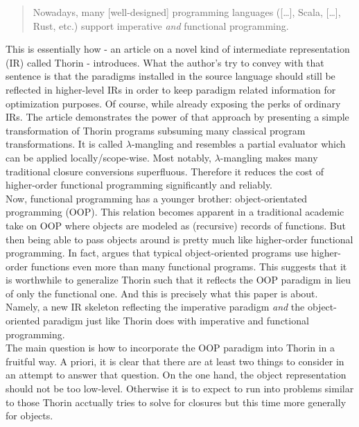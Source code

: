 \begin{quotation}
  Nowadays, many [well-designed] programming languages ([\ldots], Scala, [\ldots], Rust, etc.) support imperative \textit{and} functional programming.
\end{quotation}
This is essentially how \cite{thorin} - an article on a novel kind of intermediate representation (IR) called Thorin - introduces.
What the author's try to convey with that sentence is that the paradigms installed in the source language should still be reflected in higher-level IRs in order to keep paradigm related information for optimization purposes.
Of course, while already exposing the perks of ordinary IRs.
The article demonstrates the power of that approach by presenting a simple transformation of Thorin programs subsuming {\glqq}many classical program transformations{\grqq}.
It is called $\lambda$-mangling and resembles a partial evaluator which can be applied locally/scope-wise.
Most notably, $\lambda$-mangling makes many traditional closure conversions superfluous. Therefore it reduces the cost of higher-order functional programming significantly and reliably.
\\
Now, functional programming has a younger brother: object-orientated programming (OOP).
This relation becomes apparent in a traditional academic take on OOP where objects are modeled as (recursive) records of functions.
But then being able to pass objects around is pretty much like higher-order functional programming.
In fact, \cite{cook} argues that typical object-oriented programs use higher-order functions even more than many functional programs.
This suggests that it is worthwhile to generalize Thorin such that it reflects the OOP paradigm in lieu of only the functional one.
And this is precisely what this paper is about.
Namely, a new IR skeleton reflecting the imperative paradigm \textit{and} the object-oriented paradigm just like Thorin does with imperative and functional programming.
\\
The main question is how to incorporate the OOP paradigm into Thorin in a fruitful way.
A priori, it is clear that there are at least two things to consider in an attempt to answer that question.
On the one hand, the object representation should not be too low-level.
Otherwise it is to expect to run into problems similar to those Thorin acctually tries to solve for closures but this time more generally for objects.
